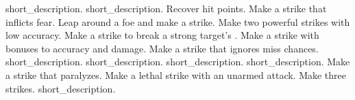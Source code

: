 \begin{spelllist}
 short_description.
 short_description.
 Recover hit points.
 Make a strike that inflicts fear.
 Leap around a foe and make a strike.
 Make two powerful strikes with low accuracy.
 Make a strike to break a strong target's .
 Make a strike with bonuses to accuracy and damage.
 Make a strike that ignores miss chances.
 short_description.
 short_description.
 short_description.
 short_description.
 Make a strike that paralyzes.
 Make a lethal strike with an unarmed attack.
 Make three strikes.
 short_description.
\end{spelllist}



\small
